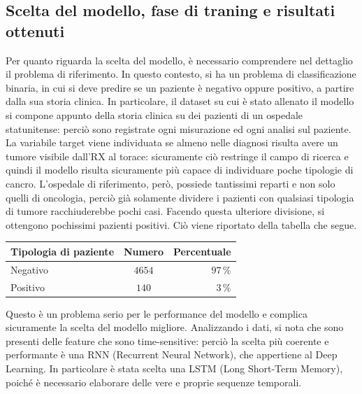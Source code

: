 \documentclass[10pt,a4paper]{article}
\begin{document}
        \subsection*{Scelta del modello, fase di traning e risultati ottenuti}
        Per quanto riguarda la scelta del modello, è necessario comprendere nel dettaglio il problema di riferimento. In
        questo contesto, si ha un problema di classificazione binaria, in cui si deve predire se un paziente è negativo
        oppure positivo, a partire dalla sua storia clinica. In particolare, il dataset su cui è stato allenato il modello
        si compone appunto della storia clinica su dei pazienti di un ospedale statunitense: perciò sono registrate ogni 
        misurazione ed ogni analisi sul paziente. La variabile target viene individuata se almeno nelle
        diagnosi risulta avere un tumore visibile dall'RX al torace: sicuramente ciò restringe il campo di ricerca e 
        quindi il modello risulta sicuramente più capace di individuare poche tipologie di cancro. L'ospedale di riferimento,
        però, possiede tantissimi reparti e non solo quelli di oncologia, perciò già solamente dividere i pazienti con qualsiasi
        tipologia di tumore racchiuderebbe pochi casi. Facendo questa ulteriore divisione, si ottengono pochissimi pazienti
        positivi. Ciò viene riportato della tabella che segue.
        \begin{table}[H]
            \centering
                \small
                \begin{tabular}{|l|c|r|}
                    \hline
                    \textbf{Tipologia di paziente} & \textbf{Numero} & \textbf{Percentuale} \\
                    \hline
                    Negativo & $4654$ & $97\,\%$ \\
                    \hline
                    Positivo & $140$ & $3\,\%$ \\
                    \hline
                \end{tabular}
        \end{table}
        \noindent Questo è un problema serio per le performance del modello e complica sicuramente la scelta del modello migliore.
        Analizzando i dati, si nota che sono presenti delle feature che sono time-sensitive: perciò la scelta più coerente
        e performante è una RNN (Recurrent Neural Network), che appertiene al Deep  Learning. In particolare è stata 
        scelta una LSTM (Long Short-Term Memory), poiché è necessario elaborare delle vere e proprie sequenze temporali. 
\end{document}
